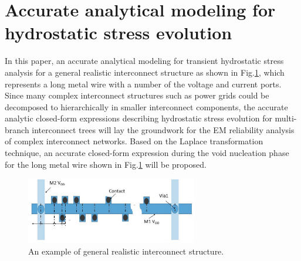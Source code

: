 \section{Accurate analytical modeling for hydrostatic stress evolution}
In this paper, an accurate analytical modeling for transient hydrostatic stress analysis for a general realistic interconnect structure as shown in Fig.\ref{fig:interconnect_tree}, which represents a long metal wire with a number of the voltage and current ports. Since many complex interconnect structures such as power grids could be decomposed to hierarchically in smaller interconnect components, the accurate analytic closed-form expressions describing hydrostatic stress evolution for multi-branch interconnect trees will lay the groundwork for the EM reliability analysis of complex interconnect networks. Based on the Laplace transformation technique, an accurate closed-form expression during the void nucleation phase for the long metal wire shown in Fig.\ref{fig:interconnect_tree} will be proposed.
\label{sec:analytical_stress}
\begin{figure}[ht] \centering
\includegraphics[width=75mm]{tree.eps}
\caption{An example of general realistic interconnect structure.}
  \label{fig:interconnect_tree}
  \vspace{-0.12in}
\end{figure}

